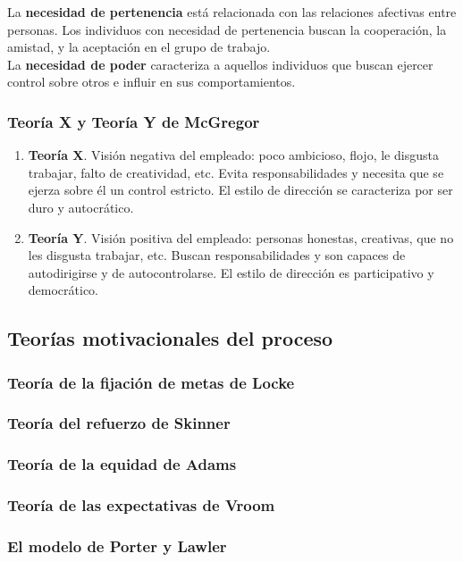 \documentclass[12pt]{article}
\theoremstyle{definition_wo_parentheses}
\begin{document}
La \textbf{necesidad de pertenencia} está relacionada con las relaciones afectivas entre personas. Los individuos con necesidad de pertenencia buscan la cooperación, la amistad, y la aceptación en el grupo de trabajo.\\

La \textbf{necesidad de poder} caracteriza a aquellos individuos que buscan ejercer control sobre otros e influir en sus comportamientos.

\subsubsection{Teoría X y Teoría Y de McGregor}
\begin{enumerate}
\item \textbf{Teoría X}. Visión negativa del empleado: poco ambicioso, flojo, le disgusta trabajar, falto de creatividad, etc. Evita responsabilidades y necesita que se ejerza sobre él un control estricto. El estilo de dirección se caracteriza por ser duro y autocrático.
\item \textbf{Teoría Y}. Visión positiva del empleado: personas honestas, creativas, que no les disgusta trabajar, etc. Buscan responsabilidades y son capaces de autodirigirse y de autocontrolarse. El estilo de dirección es participativo y democrático.
\end{enumerate}

\subsection{Teorías motivacionales del proceso}
\subsubsection{Teoría de la fijación de metas de Locke}
\subsubsection{Teoría del refuerzo de Skinner}
\subsubsection{Teoría de la equidad de Adams}
\subsubsection{Teoría de las expectativas de Vroom}
\subsubsection{El modelo de Porter y Lawler}
\end{document}
